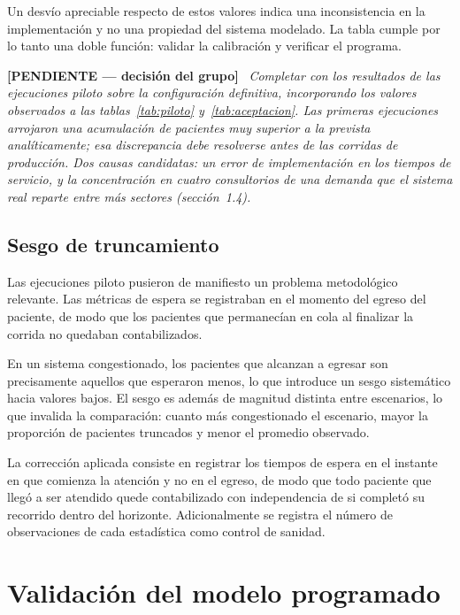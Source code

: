 \documentclass{article}
\newenvironment{pendiente}
  {\par\medskip\noindent\begingroup\color{red!65!black}%
   \textbf{[PENDIENTE — decisión del grupo]}\ \itshape}
  {\endgroup\par\medskip}
\begin{document}
Un desvío apreciable respecto de estos valores indica una inconsistencia en la
implementación y no una propiedad del sistema modelado. La tabla cumple por lo
tanto una doble función: validar la calibración y verificar el programa.

\begin{pendiente}
Completar con los resultados de las ejecuciones piloto sobre la configuración
definitiva, incorporando los valores observados a las
tablas~\ref{tab:piloto} y~\ref{tab:aceptacion}. Las primeras ejecuciones
arrojaron una acumulación de pacientes muy superior a la prevista
analíticamente; esa discrepancia debe resolverse antes de las corridas de
producción. Dos causas candidatas: un error de implementación en los tiempos
de servicio, y la concentración en cuatro consultorios de una demanda que el
sistema real reparte entre más sectores (sección~1.4).
\end{pendiente}

\subsection{Sesgo de truncamiento}

Las ejecuciones piloto pusieron de manifiesto un problema metodológico
relevante. Las métricas de espera se registraban en el momento del egreso del
paciente, de modo que los pacientes que permanecían en cola al finalizar la
corrida no quedaban contabilizados.

En un sistema congestionado, los pacientes que alcanzan a egresar son
precisamente aquellos que esperaron menos, lo que introduce un sesgo
sistemático hacia valores bajos. El sesgo es además de magnitud distinta
entre escenarios, lo que invalida la comparación: cuanto más congestionado el
escenario, mayor la proporción de pacientes truncados y menor el promedio
observado.

La corrección aplicada consiste en registrar los tiempos de espera en el
instante en que comienza la atención y no en el egreso, de modo que todo
paciente que llegó a ser atendido quede contabilizado con independencia de si
completó su recorrido dentro del horizonte. Adicionalmente se registra el
número de observaciones de cada estadística como control de sanidad.

\section{Validación del modelo programado}
\end{document}
